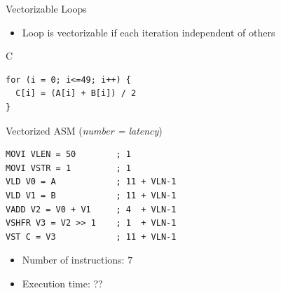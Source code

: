 \documentclass[presentation]{beamer}
\begin{document}
\begin{frame}[label={sec:org3c5e0d4},fragile]{Vectorizable Loops}
 \begin{block}{}
\begin{itemize}
\item Loop is \alert{vectorizable} if each iteration independent of others
\end{itemize}
\end{block}
\begin{block}{C}
\lstset{language=C,label= ,caption= ,captionpos=b,numbers=none}
\begin{lstlisting}
for (i = 0; i<=49; i++) {
  C[i] = (A[i] + B[i]) / 2
}
\end{lstlisting}
\end{block}
\begin{block}{Vectorized ASM (\emph{number = latency})}
\lstset{language=asm,label= ,caption= ,captionpos=b,numbers=none}
\begin{lstlisting}
MOVI VLEN = 50        ; 1
MOVI VSTR = 1         ; 1
VLD V0 = A            ; 11 + VLN-1
VLD V1 = B            ; 11 + VLN-1
VADD V2 = V0 + V1     ; 4  + VLN-1
VSHFR V3 = V2 >> 1    ; 1  + VLN-1
VST C = V3            ; 11 + VLN-1
\end{lstlisting}
\begin{itemize}
\item Number of \alert{instructions}: \alert{\(7\)}
\item Execution time: ??
\end{itemize}
\end{block}
\end{frame}
\end{document}
